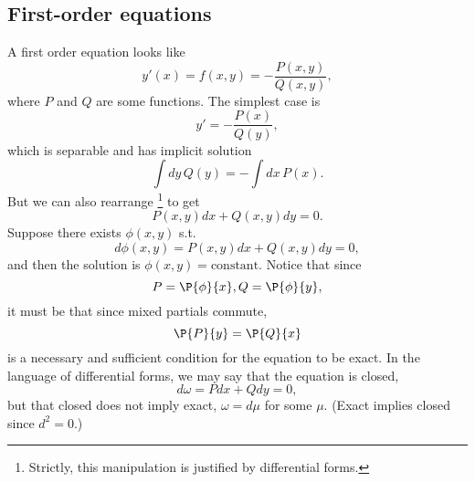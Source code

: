 \subsection*{First-order equations}
A first order equation looks like
\begin{equation}
    y'(x) = f(x,y) = -\frac{P(x,y)}{Q(x,y)},
\end{equation}
where $P$ and $Q$ are some functions. The simplest case is
\begin{equation}
    y' = -\frac{P(x)}{Q(y)},
\end{equation}
which is separable and has implicit solution
\begin{equation}
    \int dy\, Q(y) = -\int dx \, P(x).
\end{equation}
But we can also rearrange%
    \footnote{Strictly, this manipulation is justified by differential forms.}
to get
\begin{equation}
    P(x,y) dx + Q(x,y) dy=0.
\end{equation}
Suppose there exists $\phi(x,y)$ s.t.
\begin{equation}
    d\phi(x,y) = P(x,y) dx + Q(x,y)dy =0,
\end{equation}
and then the solution is $\phi(x,y)=\text{constant}$. Notice that since
\begin{equation}
    P=\P{\phi}{x}, Q = \P{\phi}{y},
\end{equation}
it must be that since mixed partials commute,
\begin{equation}
    \P{P}{y} = \P{Q}{x}
\end{equation}
is a necessary and sufficient condition for the equation to be exact. In the language of differential forms, we may say that the equation is closed,
\begin{equation}
    d\omega = P dx + Qdy=0,
\end{equation}
but that closed does not imply exact, $\omega = d\mu$ for some $\mu$. (Exact implies closed since $d^2=0$.)

